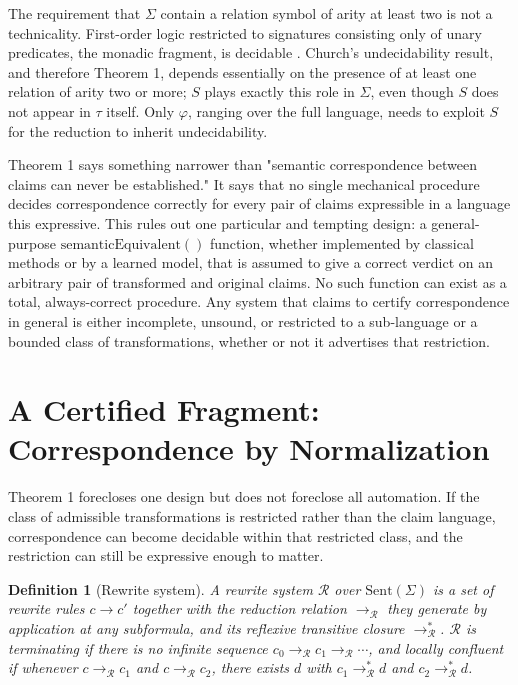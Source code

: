 \documentclass[11pt]{article}
\newtheorem{definition}{Definition}
\begin{document}
The requirement that $\Sigma$ contain a relation symbol of arity at least two is not a technicality. First-order logic restricted to signatures consisting only of unary predicates, the monadic fragment, is decidable \cite{lowenheim1915}. Church's undecidability result, and therefore Theorem 1, depends essentially on the presence of at least one relation of arity two or more; $S$ plays exactly this role in $\Sigma$, even though $S$ does not appear in $\tau$ itself. Only $\varphi$, ranging over the full language, needs to exploit $S$ for the reduction to inherit undecidability.

Theorem 1 says something narrower than "semantic correspondence between claims can never be established." It says that no single mechanical procedure decides correspondence correctly for every pair of claims expressible in a language this expressive. This rules out one particular and tempting design: a general-purpose $\mathrm{semanticEquivalent}()$ function, whether implemented by classical methods or by a learned model, that is assumed to give a correct verdict on an arbitrary pair of transformed and original claims. No such function can exist as a total, always-correct procedure. Any system that claims to certify correspondence in general is either incomplete, unsound, or restricted to a sub-language or a bounded class of transformations, whether or not it advertises that restriction.

\section{A Certified Fragment: Correspondence by Normalization}

Theorem 1 forecloses one design but does not foreclose all automation. If the class of admissible transformations is restricted rather than the claim language, correspondence can become decidable within that restricted class, and the restriction can still be expressive enough to matter.

\begin{definition}[Rewrite system]
A rewrite system $\mathcal{R}$ over $\mathrm{Sent}(\Sigma)$ is a set of rewrite rules $c \to c'$ together with the reduction relation $\to_{\mathcal{R}}$ they generate by application at any subformula, and its reflexive transitive closure $\to_{\mathcal{R}}^{*}$. $\mathcal{R}$ is \emph{terminating} if there is no infinite sequence $c_0 \to_{\mathcal{R}} c_1 \to_{\mathcal{R}} \cdots$, and \emph{locally confluent} if whenever $c \to_{\mathcal{R}} c_1$ and $c \to_{\mathcal{R}} c_2$, there exists $d$ with $c_1 \to_{\mathcal{R}}^{*} d$ and $c_2 \to_{\mathcal{R}}^{*} d$.
\end{definition}
\end{document}
